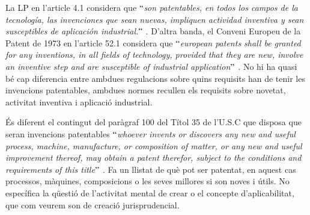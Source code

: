 \documentclass[12pt]{article}
\begin{document}
\begin{justify}
La LP en l’article 4.1 considera que $``$\textit{son patentables, en todos los campos de la tecnología, las invenciones que sean nuevas, impliquen actividad inventiva y sean susceptibles de aplicación industrial.$"$ }. D’altra banda, el Conveni Europeu de la Patent de 1973 en l’article 52.1 considera que $``$\textit{european patents shall be granted for any inventions, in all fields of technology, provided that they are new, involve an inventive step and are susceptible of industrial application$"$ . }No hi ha quasi bé cap diferencia entre ambdues regulacions sobre quins requisits han de tenir les invencions patentables, ambdues normes recullen els requisits sobre novetat, activitat inventiva i aplicació industrial. 
\end{justify}\par


\vspace{\baselineskip}
\begin{justify}
És diferent el contingut del paràgraf 100 del Títol 35 de l’U.S.C que disposa que seran invencions patentables $``$\textit{whoever invents or discovers any new and useful process, machine, manufacture, or composition of matter, or any new and useful improvement thereof, may obtain a patent therefor, subject to the conditions and requirements of this title$"$ .} Fa un llistat de què pot ser patentat, en aquest cas processos, màquines, composicions o les seves millores si son noves i útils. No específica la qüestió de l’activitat mental de crear o el concepte d’aplicabilitat, que com veurem son de creació jurisprudencial. 
\end{justify}\par
\end{document}
